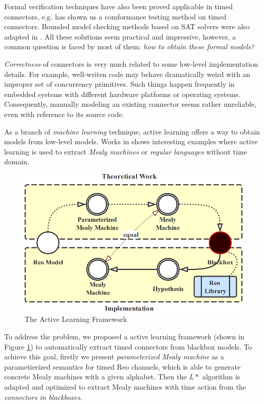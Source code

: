 \documentclass[conference, a4paper]{IEEEtran}
\begin{document}
Formal verification techniques have also been proved applicable in timed connectors, e.g.
\cite{DBLP:conf/tase/LiCWS15} has shown us a comformance testing method on timed connectors.
Bounded model checking methods based on SAT solvers were also adapted in
\cite{DBLP:journals/scp/Kemper12}.
All these solutions seem practical and impressive, however, a common question is faced by
most of them: \emph{how to obtain these formal models?}

\emph{Correctness} of connectors is very much related to some low-level implementation details.
For example, well-writen code may behave dramatically weird with an improper set of concurrency
primitives. Such things happen frequently in embedded systems with different hardware platforms or
operating systems. Consequently, manually modeling an existing connector seems rather unreliable,
even with reference to its source code.

As a branch of \emph{machine learning} technique, active learning offers a way to obtain models from
low-level models. Works in \cite{DBLP:journals/mt/Daelemans10, DBLP:journals/iandc/Angluin87,
DBLP:conf/fase/RaffeltS06} shows interesting examples where active learning is used to extract
\emph{Mealy machines} or \emph{regular languages} without time domain.

\begin{figure}[ht]
  \begin{center}
    \includegraphics[width=.4\textwidth]{./images/howto.png}
  \end{center}
  \caption{The Active Learning Framework}
  \label{fig:howto}
\end{figure}

To address the problem, we proposed a active learning framework (shown in Figure \ref{fig:howto}) to
automatically extract timed connectors from blackbox models. To achieve this goal, firstly we
present \emph{parameterized Mealy machine} as a parametierized semantics for timed Reo channels,
which is able to generate concrete Mealy machines with a given alphabet. Then the $L*$ algorithm
\cite{DBLP:journals/iandc/Angluin87}
is adapted and optimized to extract Mealy machines with time action from the \emph{connectors in
blackboxes}. 
\end{document}
